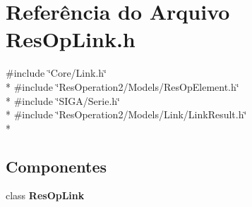 \section{Referência do Arquivo Res\+Op\+Link.\+h}
\label{_res_op_link_8h}
{\ttfamily \#include \char`\"{}Core/\+Link.\+h\char`\"{}}\\*
{\ttfamily \#include \char`\"{}Res\+Operation2/\+Models/\+Res\+Op\+Element.\+h\char`\"{}}\\*
{\ttfamily \#include \char`\"{}S\+I\+G\+A/\+Serie.\+h\char`\"{}}\\*
{\ttfamily \#include \char`\"{}Res\+Operation2/\+Models/\+Link/\+Link\+Result.\+h\char`\"{}}\\*
\subsection*{Componentes}
\begin{DoxyCompactItemize}
\item 
class {\bf Res\+Op\+Link}
\end{DoxyCompactItemize}
